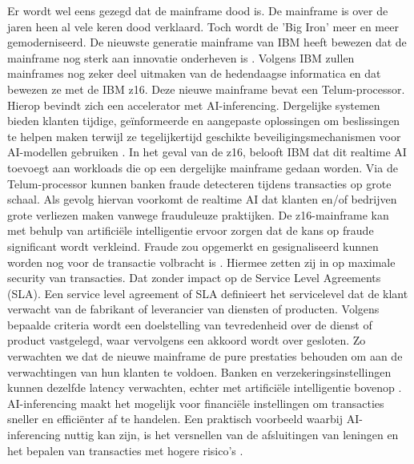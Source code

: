 Er wordt wel eens gezegd dat de mainframe dood is. De mainframe is over de jaren heen al vele keren dood verklaard. Toch wordt de 'Big Iron' meer en meer gemoderniseerd. De nieuwste generatie mainframe van IBM heeft bewezen dat de mainframe nog sterk aan innovatie onderheven is \autocite{Almekinders2022}. Volgens IBM zullen mainframes nog zeker deel uitmaken van de hedendaagse informatica en dat bewezen ze met de IBM z16. Deze nieuwe mainframe bevat een Telum-processor. Hierop bevindt zich een accelerator met AI-inferencing. Dergelijke systemen bieden klanten tijdige, geïnformeerde en aangepaste oplossingen om beslissingen te helpen maken terwijl ze tegelijkertijd geschikte beveiligingsmechanismen voor AI-modellen gebruiken \autocite{Cammarota2020}. In het geval van de z16, belooft IBM dat dit realtime AI toevoegt aan workloads die op een dergelijke mainframe gedaan worden. Via de Telum-processor kunnen banken fraude detecteren tijdens transacties op grote schaal. Als gevolg hiervan voorkomt de realtime AI dat klanten en/of bedrijven grote verliezen maken vanwege frauduleuze praktijken. De z16-mainframe kan met behulp van artificiële intelligentie ervoor zorgen dat de kans op fraude significant wordt verkleind. Fraude zou opgemerkt en gesignaliseerd kunnen worden nog voor de transactie volbracht is \autocite{Saran2022}. Hiermee zetten zij in op maximale security van transacties. Dat zonder impact op de Service Level Agreements (SLA). Een service level agreement of SLA definieert het servicelevel dat de klant verwacht van de fabrikant of leverancier van diensten of producten. Volgens bepaalde criteria wordt een doelstelling van tevredenheid over de dienst of product vastgelegd, waar vervolgens een akkoord wordt over gesloten. Zo verwachten we dat de nieuwe mainframe de pure prestaties behouden om aan de verwachtingen van hun klanten te voldoen. Banken en verzekeringsinstellingen kunnen dezelfde latency verwachten, echter met artificiële intelligentie bovenop \autocite{Saran2022}. AI-inferencing maakt het mogelijk voor financiële instellingen om transacties sneller en efficiënter af te handelen. Een praktisch voorbeeld waarbij AI-inferencing nuttig kan zijn, is het versnellen van de afsluitingen van leningen en het bepalen van transacties met hogere risico's \autocite{Saran2022}.


\subsection{}
\label{sec:Quantum computing en IBM z16}

